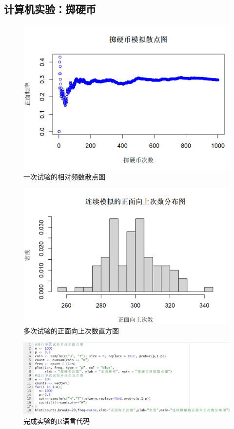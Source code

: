 \documentclass{article}
\begin{document}
\begin{CJK}{UTF8}{gbsn}
\section{计算机实验：掷硬币}
\begin{figure}[htbp]
    \centering
    \includegraphics[scale=0.7]{plot1.png}
    \caption{一次试验的相对频数散点图}
    \label{1}
\end{figure}
\begin{figure}[htbp]
    \centering
    \includegraphics[scale=0.7]{plot2.png}
    \caption{多次试验的正面向上次数直方图}
    \label{2}
\end{figure}
\begin{figure}[htbp]
    \centering
    \includegraphics[scale=0.5]{code.png}
    \caption{完成实验的R语言代码}
    \label{3}
\end{figure}
\end{CJK}
\end{document}
